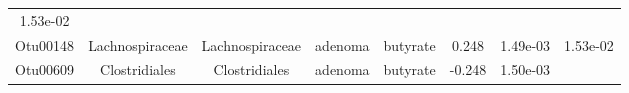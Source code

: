 \documentclass[11pt,]{article}
\begin{document}
\begin{longtable}[]{@{}cccccccc@{}}
\begin{minipage}[t]{0.08\columnwidth}
1.53e-02\strut
\end{minipage}\tabularnewline
\begin{minipage}[t]{0.08\columnwidth}\centering\strut
Otu00148\strut
\end{minipage} & \begin{minipage}[t]{0.15\columnwidth}\centering\strut
Lachnospiraceae\strut
\end{minipage} & \begin{minipage}[t]{0.15\columnwidth}\centering\strut
Lachnospiraceae\strut
\end{minipage} & \begin{minipage}[t]{0.08\columnwidth}\centering\strut
adenoma\strut
\end{minipage} & \begin{minipage}[t]{0.09\columnwidth}\centering\strut
butyrate\strut
\end{minipage} & \begin{minipage}[t]{0.07\columnwidth}\centering\strut
0.248\strut
\end{minipage} & \begin{minipage}[t]{0.08\columnwidth}\centering\strut
1.49e-03\strut
\end{minipage} & \begin{minipage}[t]{0.08\columnwidth}\centering\strut
1.53e-02\strut
\end{minipage}\tabularnewline
\begin{minipage}[t]{0.08\columnwidth}\centering\strut
Otu00609\strut
\end{minipage} & \begin{minipage}[t]{0.15\columnwidth}\centering\strut
Clostridiales\strut
\end{minipage} & \begin{minipage}[t]{0.15\columnwidth}\centering\strut
Clostridiales\strut
\end{minipage} & \begin{minipage}[t]{0.08\columnwidth}\centering\strut
adenoma\strut
\end{minipage} & \begin{minipage}[t]{0.09\columnwidth}\centering\strut
butyrate\strut
\end{minipage} & \begin{minipage}[t]{0.07\columnwidth}\centering\strut
-0.248\strut
\end{minipage} & \begin{minipage}[t]{0.08\columnwidth}\centering\strut
1.50e-03\strut
\end{minipage} & \begin{minipage}[t]{0.08\columnwidth}\centering\strut

\end{minipage}
\end{longtable}
\end{document}
